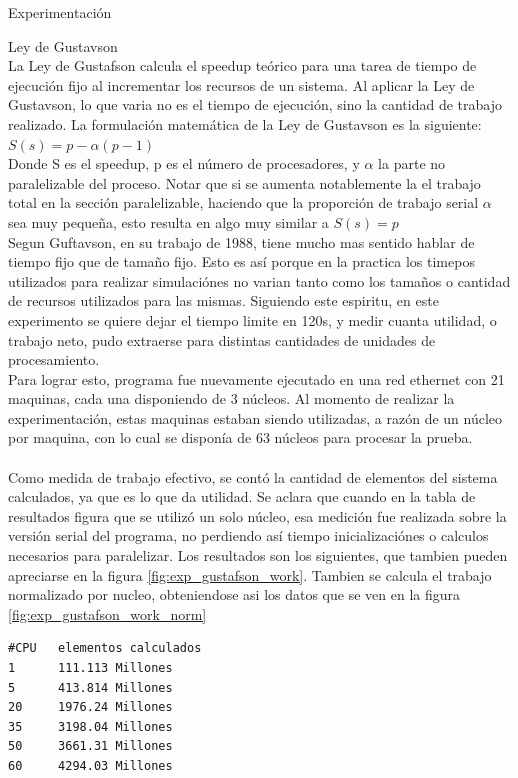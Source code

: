 \begin{section}{Experimentación}
\begin{subsection}{Ley de Gustavson}
~\\
La Ley de Gustafson calcula el speedup teórico para una tarea de tiempo de ejecución fijo al incrementar los recursos de un sistema. Al aplicar la Ley de Gustavson, lo que varia no es el tiempo de ejecución, sino la cantidad de trabajo realizado. La formulación matemática de la Ley de Gustavson es la siguiente:
~\\
{\centering
$S(s) = p - \alpha(p-1)$
}
~\\
Donde S es el speedup, p es el número de procesadores, y $\alpha$ la parte no paralelizable del proceso. Notar que si se aumenta notablemente la el trabajo total en la sección paralelizable, haciendo que la proporción de trabajo serial $\alpha$ sea muy pequeña, esto resulta en algo muy similar a $S(s) = p$
~\\
Segun Guftavson, en su trabajo de 1988, tiene mucho mas sentido hablar de tiempo fijo que de tamaño fijo. Esto es así porque en la practica los timepos utilizados para realizar simulaciónes no varian tanto como los tamaños o cantidad de recursos utilizados para las mismas. Siguiendo este espiritu, en este experimento se quiere dejar el tiempo limite en 120s, y medir cuanta utilidad, o trabajo neto, pudo extraerse para distintas cantidades de unidades de procesamiento.
~\\
Para lograr esto, programa fue nuevamente ejecutado en una red ethernet con 21 maquinas, cada una disponiendo de 3 núcleos. Al momento de realizar la experimentación, estas maquinas estaban siendo utilizadas, a razón de un núcleo por maquina, con lo cual se disponía de 63 núcleos para procesar la prueba. 
~\\
~\\
Como medida de trabajo efectivo, se contó la cantidad de elementos del sistema calculados, ya que es lo que da utilidad. Se aclara que cuando en la tabla de resultados figura que se utilizó un solo núcleo, esa medición fue realizada sobre la versión serial del programa, no perdiendo así tiempo inicializaciónes o calculos necesarios para paralelizar. Los resultados son los siguientes, que tambien pueden apreciarse en la figura \ref{fig:exp_gustafson_work}. Tambien se calcula el trabajo normalizado por nucleo, obteniendose asi los datos que se ven en la figura \ref{fig:exp_gustafson_work_norm}
~\\
\begin{minipage}{\linewidth}

\begin{tcolorbox}[colback=blue!5!white,colframe=blue!75!black,title=Trabajo]
\begin{verbatim}
#CPU   elementos calculados
1      111.113 Millones
5      413.814 Millones
20     1976.24 Millones
35     3198.04 Millones
50     3661.31 Millones
60     4294.03 Millones
\end{verbatim}
\end{tcolorbox}
\end{minipage}


\end{subsection}
\end{section}
